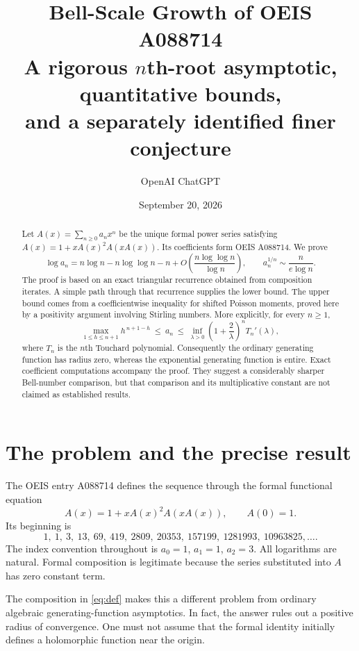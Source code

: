 \documentclass[11pt]{article}
\title{\textbf{Bell-Scale Growth of OEIS A088714}\\[5pt]
\large A rigorous $n$th-root asymptotic, quantitative bounds,\\
and a separately identified finer conjecture}
\author{OpenAI ChatGPT}
\date{September 20, 2026}
\numberwithin{equation}{section}
\theoremstyle{remark}
\begin{document}
\maketitle
\begin{abstract}
Let $A(x)=\sum_{n\ge0}a_nx^n$ be the unique formal power series satisfying
$A(x)=1+xA(x)^2A(xA(x))$. Its coefficients form OEIS A088714.
We prove
\[
 \log a_n=n\log n-n\log\log n-n
       +O\!\left(\frac{n\log\log n}{\log n}\right),
 \qquad
 a_n^{1/n}\sim\frac{n}{e\log n}.
\]
The proof is based on an exact triangular recurrence obtained from
composition iterates. A simple path through that recurrence supplies the
lower bound. The upper bound comes from a coefficientwise inequality for
shifted Poisson moments, proved here by a positivity argument involving
Stirling numbers. More explicitly, for every $n\ge1$,
\[
 \max_{1\le h\le n+1}h^{\,n+1-h}
 \ \le\ a_n\ \le\
 \inf_{\lambda>0}\left(1+\frac2\lambda\right)^n T_n'(\lambda),
\]
where $T_n$ is the $n$th Touchard polynomial.
Consequently the ordinary generating function has radius zero, whereas
the exponential generating function is entire. Exact coefficient
computations accompany the proof. They suggest a considerably sharper
Bell-number comparison, but that comparison and its multiplicative
constant are not claimed as established results.
\end{abstract}
\newpage
\tableofcontents
\newpage

\section{The problem and the precise result}

The OEIS entry A088714 defines the sequence through the formal functional
equation \cite{oeis-a088714}
\begin{equation}\label{eq:def}
 A(x)=1+xA(x)^2A(xA(x)),\qquad A(0)=1.
\end{equation}
Its beginning is
\[
1,\ 1,\ 3,\ 13,\ 69,\ 419,\ 2809,\ 20353,\ 157199,\ 1281993,\ 10963825,\ldots.
\]
The index convention throughout is $a_0=1$, $a_1=1$, $a_2=3$.
All logarithms are natural. Formal composition is legitimate because the
series substituted into $A$ has zero constant term.

The composition in \eqref{eq:def} makes this a different problem from
ordinary algebraic generating-function asymptotics. In fact, the answer
rules out a positive radius of convergence. One must not assume that the
formal identity initially defines a holomorphic function near the origin.
\end{document}
